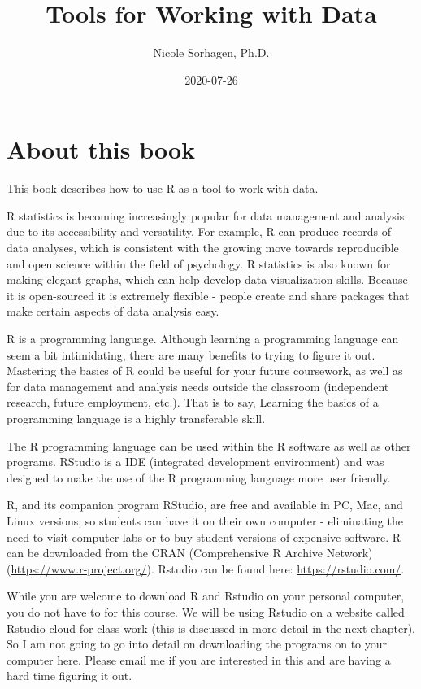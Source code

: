 \documentclass[
]{book}
\title{Tools for Working with Data}
\author{Nicole Sorhagen, Ph.D.}
\date{2020-07-26}
\begin{document}
\maketitle

{
\setcounter{tocdepth}{1}
\tableofcontents
}
\hypertarget{about-this-book}{%
\chapter{About this book}\label{about-this-book}}

This book describes how to use R as a tool to work with data.

R statistics is becoming increasingly popular for data management and analysis due to its accessibility and versatility. For example, R can produce records of data analyses, which is consistent with the growing move towards reproducible and open science within the field of psychology. R statistics is also known for making elegant graphs, which can help develop data visualization skills. Because it is open-sourced it is extremely flexible - people create and share packages that make certain aspects of data analysis easy.

R is a programming language. Although learning a programming language can seem a bit intimidating, there are many benefits to trying to figure it out. Mastering the basics of R could be useful for your future coursework, as well as for data management and analysis needs outside the classroom (independent research, future employment, etc.). That is to say, Learning the basics of a programming language is a highly transferable skill.

The R programming language can be used within the R software as well as other programs. RStudio is a IDE (integrated development environment) and was designed to make the use of the R programming language more user friendly.

R, and its companion program RStudio, are free and available in PC, Mac, and Linux versions, so students can have it on their own computer - eliminating the need to visit computer labs or to buy student versions of expensive software. R can be downloaded from the CRAN (Comprehensive R Archive Network) (\url{https://www.r-project.org/}). Rstudio can be found here: \url{https://rstudio.com/}.

While you are welcome to download R and Rstudio on your personal computer, you do not have to for this course. We will be using Rstudio on a website called Rstudio cloud for class work (this is discussed in more detail in the next chapter). So I am not going to go into detail on downloading the programs on to your computer here. Please email me if you are interested in this and are having a hard time figuring it out.
\end{document}

